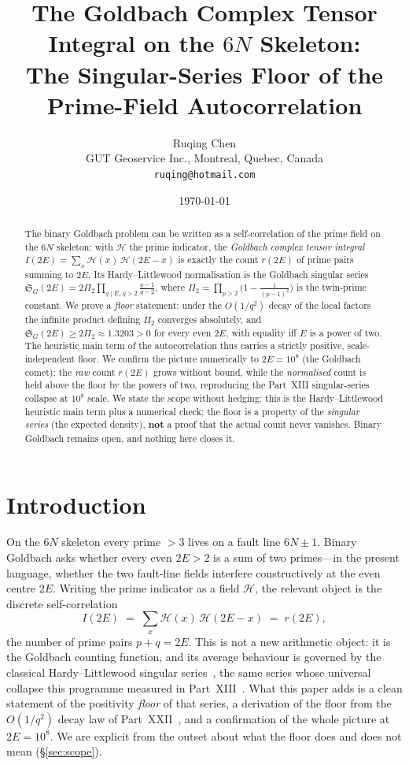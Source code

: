 \documentclass[11pt,a4paper]{article}
\title{\Large \textbf{The Goldbach Complex Tensor Integral on the $6N$ Skeleton:\\
The Singular-Series Floor of the Prime-Field Autocorrelation}}
\author{Ruqing Chen\\
\small GUT Geoservice Inc., Montreal, Quebec, Canada\\
\small \texttt{ruqing@hotmail.com}}
\date{\today}
\theoremstyle{remark}\newtheorem{remark}{Remark}
\begin{document}
\maketitle

\begin{abstract}
The binary Goldbach problem can be written as a self-correlation of the prime field
on the $6N$ skeleton: with $\mathcal{H}$ the prime indicator, the
\emph{Goldbach complex tensor integral} $I(2E)=\sum_x \mathcal{H}(x)\,\mathcal{H}(2E-x)$
is exactly the count $r(2E)$ of prime pairs summing to $2E$. Its
Hardy--Littlewood normalisation is the Goldbach singular series
$\mathfrak{S}_G(2E)=2\Pi_2\prod_{q\mid E,\,q>2}\frac{q-1}{q-2}$, where
$\Pi_2=\prod_{p>2}\bigl(1-\tfrac1{(p-1)^2}\bigr)$ is the twin-prime constant. We
prove a \emph{floor} statement: under the $O(1/q^2)$ decay of the local factors the
infinite product defining $\Pi_2$ converges absolutely, and
$\mathfrak{S}_G(2E)\ge 2\Pi_2\approx1.3203>0$ for every even $2E$, with equality iff
$E$ is a power of two. The heuristic main term of the autocorrelation thus carries a
strictly positive, scale-independent floor. We confirm the picture numerically to
$2E=10^8$ (the Goldbach comet): the \emph{raw} count $r(2E)$ grows without bound,
while the \emph{normalised} count is held above the floor by the powers of two,
reproducing the Part~XIII singular-series collapse at $10^8$ scale. We state the
scope without hedging: this is the Hardy--Littlewood heuristic main term plus a
numerical check; the floor is a property of the \emph{singular series} (the expected
density), \textbf{not} a proof that the actual count never vanishes. Binary Goldbach
remains open, and nothing here closes it.
\end{abstract}

\section{Introduction}
On the $6N$ skeleton every prime $>3$ lives on a fault line $6N\pm1$. Binary
Goldbach asks whether every even $2E>2$ is a sum of two primes---in the present
language, whether the two fault-line fields interfere constructively at the even
centre $2E$. Writing the prime indicator as a field $\mathcal{H}$, the relevant
object is the discrete self-correlation
\begin{equation}
  I(2E)\;=\;\sum_{x}\mathcal{H}(x)\,\mathcal{H}(2E-x)\;=\;r(2E),
\end{equation}
the number of prime pairs $p+q=2E$. This is not a new arithmetic object: it is the
Goldbach counting function, and its average behaviour is governed by the classical
Hardy--Littlewood singular series~\cite{HL}, the same series whose universal
collapse this programme measured in Part~XIII~\cite{ChenXIII}. What this paper adds
is a clean statement of the positivity \emph{floor} of that series, a derivation of
the floor from the $O(1/q^2)$ decay law of Part~XXII~\cite{ChenXXII}, and a
confirmation of the whole picture at $2E=10^8$. We are explicit from the outset
about what the floor does and does not mean (\S\ref{sec:scope}).
\end{document}
